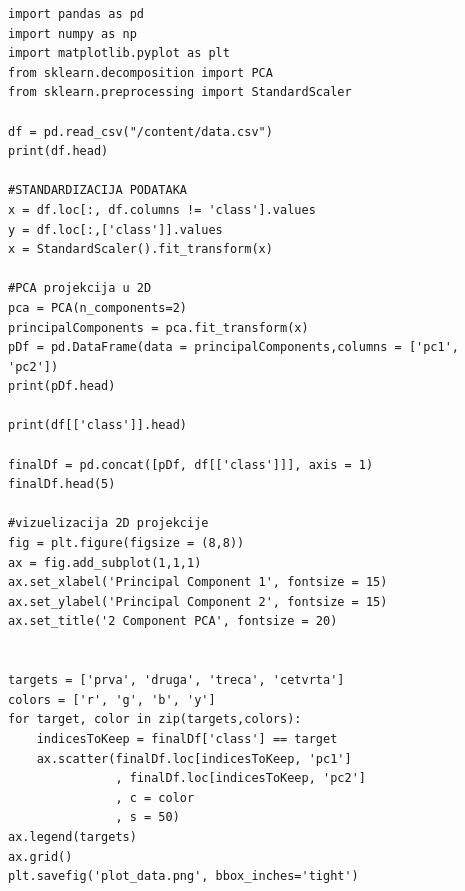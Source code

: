 \documentclass[a4paper]{article}
\begin{document}
\begin{lstlisting}[caption={Vizuelizacija podataka PCA 2D projekcijom},frame=single, label=data]
import pandas as pd 
import numpy as np
import matplotlib.pyplot as plt
from sklearn.decomposition import PCA
from sklearn.preprocessing import StandardScaler

df = pd.read_csv("/content/data.csv")
print(df.head)

#STANDARDIZACIJA PODATAKA
x = df.loc[:, df.columns != 'class'].values
y = df.loc[:,['class']].values
x = StandardScaler().fit_transform(x)

#PCA projekcija u 2D
pca = PCA(n_components=2)
principalComponents = pca.fit_transform(x)
pDf = pd.DataFrame(data = principalComponents,columns = ['pc1', 'pc2'])
print(pDf.head)

print(df[['class']].head)

finalDf = pd.concat([pDf, df[['class']]], axis = 1)
finalDf.head(5)

#vizuelizacija 2D projekcije
fig = plt.figure(figsize = (8,8))
ax = fig.add_subplot(1,1,1) 
ax.set_xlabel('Principal Component 1', fontsize = 15)
ax.set_ylabel('Principal Component 2', fontsize = 15)
ax.set_title('2 Component PCA', fontsize = 20)


targets = ['prva', 'druga', 'treca', 'cetvrta']
colors = ['r', 'g', 'b', 'y']
for target, color in zip(targets,colors):
    indicesToKeep = finalDf['class'] == target
    ax.scatter(finalDf.loc[indicesToKeep, 'pc1']
               , finalDf.loc[indicesToKeep, 'pc2']
               , c = color
               , s = 50)
ax.legend(targets)
ax.grid()
plt.savefig('plot_data.png', bbox_inches='tight')
\end{lstlisting}
\end{document}
